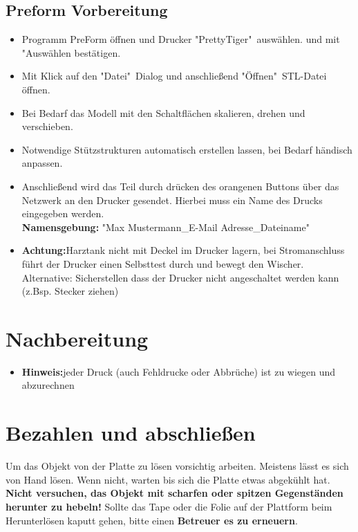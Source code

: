 \documentclass{\basedir/fablab-document}
\begin{document}
 \subsection{Preform Vorbereitung}
 
	\begin{itemize}
		\item Programm PreForm öffnen und Drucker "PrettyTiger"\, auswählen. und mit "Auswählen bestätigen.
		\item Mit Klick auf den "Datei"\ Dialog und anschließend "Öffnen"\ STL-Datei öffnen.
		\item Bei Bedarf das Modell mit den Schaltflächen skalieren, drehen und verschieben.
		\item Notwendige Stützstrukturen automatisch erstellen lassen, bei Bedarf händisch anpassen.
		\item Anschließend wird das Teil durch drücken des orangenen Buttons über das Netzwerk an den Drucker gesendet. Hierbei muss ein Name des Drucks eingegeben werden.\\
		\textbf{Namensgebung:} "Max Mustermann\_E-Mail Adresse\_Dateiname"\ 
		
		\item \textbf{Achtung:}Harztank nicht mit Deckel im Drucker lagern, bei Stromanschluss führt der Drucker einen Selbsttest durch und bewegt den Wischer. Alternative: Sicherstellen dass der Drucker nicht angeschaltet werden kann (z.Bsp. Stecker ziehen)
		\end{itemize}
	
	
	\section{Nachbereitung}
	\begin{itemize}
	\item \textbf{Hinweis:}jeder Druck (auch Fehldrucke oder Abbrüche) ist zu wiegen und abzurechnen
	\end{itemize}
	
	\section{Bezahlen und abschließen}
	
	Um das Objekt von der Platte zu lösen vorsichtig arbeiten. Meistens lässt es sich von Hand lösen. Wenn nicht,
	warten bis sich die Platte etwas abgekühlt hat. \textbf{Nicht versuchen, das Objekt mit scharfen oder spitzen Gegenständen herunter zu hebeln!}
	Sollte das Tape oder die Folie auf der Plattform beim Herunterlösen kaputt gehen, bitte einen \textbf{Betreuer es zu erneuern}.
	
\end{document}
